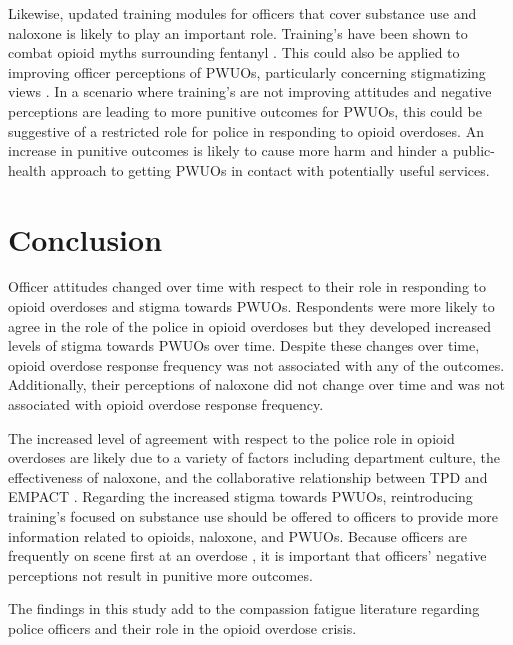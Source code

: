 Likewise, updated training modules for officers that cover substance use and naloxone is likely to play an important role. Training's have been shown to combat opioid myths surrounding fentanyl \parencite{del_pozo_can_2021}. This could also be applied to improving officer perceptions of PWUOs, particularly concerning stigmatizing views \parencite{winograd_concerns_2019}. In a scenario where training's are not improving attitudes and negative perceptions are leading to more punitive outcomes for PWUOs, this could be suggestive of a restricted role for police in responding to opioid overdoses. An increase in punitive outcomes is likely to cause more harm \parencite{binswanger_clinical_2016, ray_spatiotemporal_2023} and hinder a public-health approach to getting PWUOs in contact with potentially useful services.  

\section{Conclusion}
Officer attitudes changed over time with respect to their role in responding to opioid overdoses and stigma towards PWUOs. Respondents were more likely to agree in the role of the police in opioid overdoses but they developed increased levels of stigma towards PWUOs over time. Despite these changes over time, opioid overdose response frequency was not associated with any of the outcomes. Additionally, their perceptions of naloxone did not change over time and was not associated with opioid overdose response frequency. 

The increased level of agreement with respect to the police role in opioid overdoses are likely due to a variety of factors including department culture, the effectiveness of naloxone, and the collaborative relationship between TPD and EMPACT \parencite{white_narcan_2021, white_moving_2021}. Regarding the increased stigma towards PWUOs, reintroducing training's focused on substance use should be offered to officers to provide more information related to opioids, naloxone, and PWUOs. Because officers are frequently on scene first at an overdose \parencite{white_leveraging_2022}, it is important that officers' negative perceptions not result in punitive more outcomes. 

The findings in this study add to the compassion fatigue literature regarding police officers and their role in the opioid overdose crisis. 

\pagebreak


